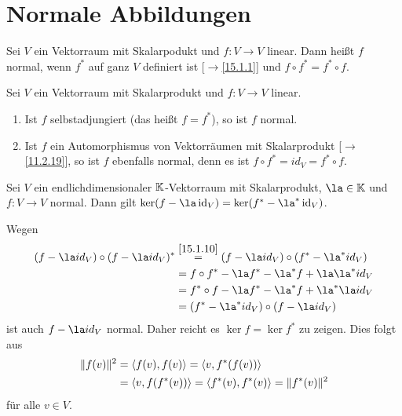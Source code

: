 \documentclass[../../main.tex]{subfiles}
\begin{document}
\section{Normale Abbildungen}

\begin{df}\label{15.2.1}
Sei $V$ ein Vektorraum mit Skalarpodukt und $f: V\to V$ linear. Dann heißt $f$ normal, wenn $f^*$ auf ganz $V$ definiert ist [$\to$\ref{15.1.1}] und $f\circ f^*=f^*\circ f$.
\end{df}	
	
\begin{bsp}\label{15.2.2} Sei $V$ ein Vektorraum mit Skalarprodukt und $f: V\to V$ linear.
\begin{enumerate}[\normalfont(a)]
\item Ist $f$ selbstadjungiert (das heißt $f=f^*$), so ist $f$ normal.
\item Ist $f$ ein Automorphismus von Vektorräumen mit Skalarprodukt [$\to$\ref{11.2.19}], so ist $f$ ebenfalls normal, denn es ist $f\circ f^*=id_V=f^*\circ f$.
\end{enumerate}
\end{bsp}

\begin{lem}\label{15.2.3}
Sei $V$ ein endlichdimensionaler $\mathbb K$-Vektorraum mit Skalarprodukt, $\la\in \K$ und $f: V\to V$ normal. Dann gilt $\ker (f-\la \id_V)=\ker (f^*-\la^* \id_V)$.
\end{lem}
\begin{cproof}
Wegen
\begin{align*}
(f-\la id_V)\circ (f-\la id_V)^*&\stackrel{\ref{15.1.10}}{=}(f-\la id_V)\circ (f^*-\la^* id_V)\\
&=f\circ f^*-\la f^*-\la^*f+\la\la^* id_V\\
&=f^*\circ f-\la f^*-\la^*f+\la^*\la id_V\\
&=(f^*-\la^* id_V)\circ (f-\la id_V)
\end{align*}
ist auch $f-\la id_V$ normal. Daher reicht es $\ker f=\ker f^*$ zu zeigen. Dies folgt aus
\begin{align*}
\| f(v)\|^2&=\langle f(v),f(v)\rangle=\langle v,f^*(f(v))\rangle\\
&=\langle v,f(f^*(v))\rangle=\langle f^*(v),f^*(v)\rangle=\| f^*(v)\|^2
\end{align*}
für alle  $v\in V$.
\end{cproof}
\end{document}
